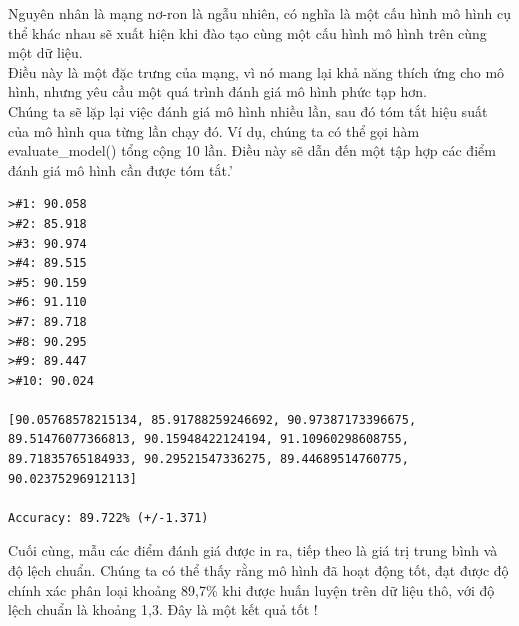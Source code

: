 Nguyên nhân là mạng nơ-ron là ngẫu nhiên, có nghĩa là một cấu hình mô hình cụ thể khác nhau sẽ xuất hiện khi đào tạo cùng một cấu hình mô hình trên cùng một dữ liệu.\\

Điều này là một đặc trưng của mạng, vì nó mang lại khả năng thích ứng cho mô hình, nhưng yêu cầu một quá trình đánh giá mô hình phức tạp hơn.\\

Chúng ta sẽ lặp lại việc đánh giá mô hình nhiều lần, sau đó tóm tắt hiệu suất của mô hình qua từng lần chạy đó. Ví dụ, chúng ta có thể gọi hàm evaluate\_model() tổng cộng 10 lần. Điều này sẽ dẫn đến một tập hợp các điểm đánh giá mô hình cần được tóm tắt.'\\

\begin{lstlisting}
>#1: 90.058
>#2: 85.918
>#3: 90.974
>#4: 89.515
>#5: 90.159
>#6: 91.110
>#7: 89.718
>#8: 90.295
>#9: 89.447
>#10: 90.024

[90.05768578215134, 85.91788259246692, 90.97387173396675, 89.51476077366813, 90.15948422124194, 91.10960298608755, 89.71835765184933, 90.29521547336275, 89.44689514760775, 90.02375296912113]

Accuracy: 89.722% (+/-1.371)

\end{lstlisting}
Cuối cùng, mẫu các điểm đánh giá được in ra, tiếp theo là giá trị trung bình và độ lệch chuẩn. Chúng ta có thể thấy rằng mô hình đã hoạt động tốt, đạt được độ chính xác phân loại khoảng 89,7\% khi được huấn luyện trên dữ liệu thô, với độ lệch chuẩn là khoảng 1,3. Đây là một kết quả tốt ! 








